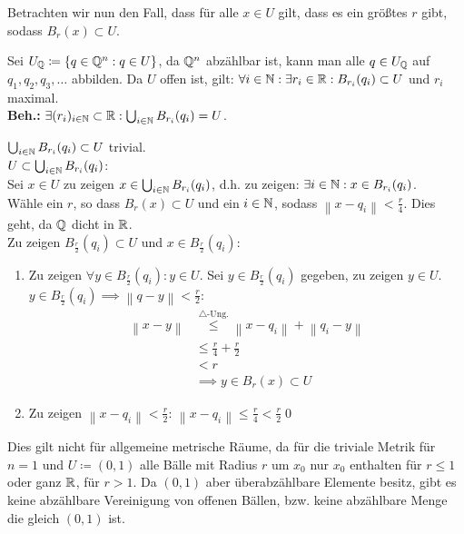 \documentclass[sectionformat=aufgabe]{gadsescript}
\begin{document}
Betrachten wir nun den Fall, dass für alle $ x \in U $ gilt, dass es ein größtes $ r $ gibt, sodass $ B_{r}(x)  \subset U $.

Sei $ U_{\mathbb{Q} } \coloneqq \left\{ q \in \mathbb{Q}^n : q \in U \right\} $, da $ \mathbb{Q} ^n $ abzählbar ist, kann man alle $ q \in U_{\mathbb{Q} }  $ auf $ q_1, q_2, q_3, \dotsc $ abbilden.
Da $ U $ offen ist, gilt: $ \forall i \in \mathbb{N} : \exists r_i \in \mathbb{R} : B_{r_i}(q_i) \subset U $ und $ r_i $ maximal.\\
\textbf{Beh.:} $ \exists (r_i)_{i \in \mathbb{N} }  \subset \mathbb{R} : \bigcup_{i \in \mathbb{N} } B_{r_i} (q_i) = U $.
\begin{proof*}
	$ \bigcup_{i \in \mathbb{N} } B_{r_i}(q_i) \subset U $ trivial.\\
	$ U \subset \bigcup_{i \in \mathbb{N} } B_{r_i}(q_i)  $:\\
	Sei $ x \in U $ zu zeigen $ x \in \bigcup_{i \in \mathbb{N} } B_{r_i}(q_i)  $, d.h. zu zeigen: $ \exists i \in \mathbb{N} : x \in B_{r_i}(q_i)  $.\\
	Wähle ein $ r $, so dass $ B_{r}(x) \subset U $ und
	ein $ i \in \mathbb{N}  $, sodass $ \left\| x - q_i \right\| < \frac{ r }{ 4 }  $.
	Dies geht, da $ \mathbb{Q}  $ dicht in $ \mathbb{R}  $.\\
	Zu zeigen $ B_{\frac{ r }{ 2 } }(q_i) \subset U $ und $ x \in B_{\frac{ r }{ 2 } }(q_i)  $:
	\begin{enumerate}[label=(\arabic*)]
		\item Zu zeigen $ \forall y \in B_{\frac{ r }{ 2 } }(q_i) : y \in U $. Sei $ y \in B_{\frac{ r }{ 2 } }(q_i) $ gegeben, zu zeigen $ y \in U $.\\
			$ y \in B_{\frac{ r }{ 2 } }(q_i) \implies \left\| q - y \right\| < \frac{ r }{ 2 }  $:
			\begin{align*}
				\left\| x - y \right\| &\overset{\triangle\text{-Ung.} }{\leq } \left\| x - q_i \right\| + \left\| q_i - y \right\| \\
						       &\leq \frac{ r }{ 4 } + \frac{ r }{ 2 } \\
						       &< r\\
						       &\implies y \in B_{r}(x) \subset U
			\end{align*}
		\item Zu zeigen $ \left\| x - q_i \right\| < \frac{ r }{ 2 }  $:
			$ \left\| x - q_i \right\| \leq \frac{ r }{ 4 } < \frac{ r }{ 2 }   $\qed
	\end{enumerate}
\end{proof*}

Dies gilt nicht für allgemeine metrische Räume, da für die triviale Metrik für $ n = 1 $ und $ U \coloneqq (0, 1) $ alle Bälle mit Radius $ r $ um $ x_0 $ nur $ x_0 $ enthalten für $ r \leq  1 $ oder ganz $ \mathbb{R}  $, für $ r > 1 $.
Da $ (0, 1) $ aber überabzählbare Elemente besitz, gibt es keine abzählbare Vereinigung von offenen Bällen, bzw. keine abzählbare Menge die gleich $ (0, 1) $ ist.
\end{document}
